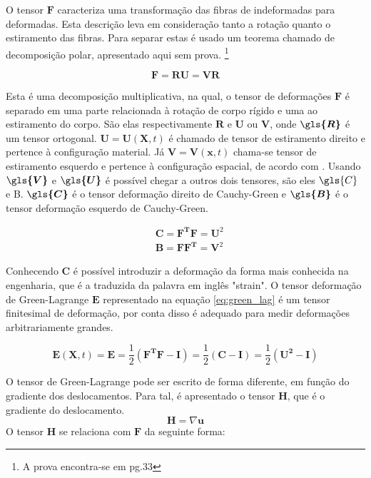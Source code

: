 O tensor $\boldsymbol{F}$ caracteriza uma transformação das fibras de indeformadas para deformadas. Esta descrição leva em consideração tanto a rotação quanto o estiramento das fibras. Para separar estas é usado um teorema chamado de decomposição polar, apresentado aqui sem prova. \footnote{A prova encontra-se em \cite{gurtin_fried_anand_2013} pg.33}

\begin{equation}
    \boldsymbol F = \boldsymbol{RU} = \boldsymbol{VR}
\end{equation}

Esta é uma decomposição multiplicativa, na qual, o tensor de deformações $ \boldsymbol{F} $ é separado em uma parte relacionada à rotação de corpo rígido e uma ao estiramento do corpo. São elas respectivamente $ \boldsymbol{R} $ e $ \boldsymbol{U} $ ou $ \boldsymbol{V} $, onde $ \boldsymbol{\gls{R}}$ é um tensor ortogonal. $ \boldsymbol U = \boldsymbol{U}(\boldsymbol{X},t) $ é chamado de tensor de estiramento direito e pertence à configuração material. Já $ \boldsymbol V = \boldsymbol{V}(\boldsymbol{x},t) $ chama-se tensor de estiramento esquerdo e pertence à configuração espacial, de acordo com \cite{intromec}. Usando $ \boldsymbol{\gls{V}} $  e $ \boldsymbol{\gls{U}} $ é possível chegar a outros dois tensores, são eles $ \gls{C}$ e \gls{B}. $ \boldsymbol{\gls{C}} $ é o tensor deformação direito de Cauchy-Green e $ \boldsymbol{\gls{B}} $ é o tensor deformação esquerdo de Cauchy-Green. 

\begin{align}
    & \boldsymbol{C} = \boldsymbol{F^TF} = \boldsymbol{U}^2 \\
    & \boldsymbol{B} = \boldsymbol{FF^T} = \boldsymbol{V}^2
\end{align}

Conhecendo $\boldsymbol{C}$ é possível introduzir a deformação da forma mais conhecida na engenharia, que é a traduzida da palavra em inglês "strain". O tensor deformação de Green-Lagrange $ \boldsymbol{E} $ representado na equação \ref{eq:green_lag} é um tensor finitesimal de deformação, por conta disso é adequado para medir deformações arbitrariamente grandes.

\begin{equation}
   \boldsymbol{E}(\boldsymbol{X},t) =  \boldsymbol{E} = \frac{1}{2}(\boldsymbol{F^TF - I}) = \frac{1}{2}(\boldsymbol{C - I}) = \frac{1}{2}(\boldsymbol{U^2 - I})
    \label{eq:green_lag}
\end{equation}

 O tensor de Green-Lagrange pode ser escrito de forma diferente, em função do gradiente dos deslocamentos. Para tal, é apresentado o tensor $\boldsymbol{H}$, que é o gradiente do deslocamento.
\begin{equation}
    \boldsymbol{H} = \nabla \boldsymbol{u}
    \label{eq:desl_gradH}
\end{equation}
O tensor $ \boldsymbol{H} $ se relaciona com $ \boldsymbol{F} $ da seguinte forma:

